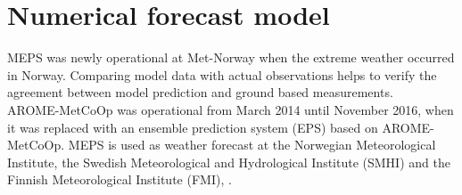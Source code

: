 \chapter{Numerical forecast model} \label{ch:MEPS}
MEPS was newly operational at Met-Norway when the extreme weather occurred in Norway. Comparing model data with actual observations helps to verify the agreement between model prediction and ground based measurements. 
\\
AROME-MetCoOp was operational from March 2014 until November 2016, when it was replaced with an ensemble prediction system (EPS) based on AROME-MetCoOp.
MEPS is used as weather forecast at the Norwegian Meteorological Institute, the Swedish Meteorological and Hydrological Institute (SMHI) and the Finnish Meteorological Institute (FMI), \citep{muller_arome-metcoop:_2017, koltzow_metcoop_2017}.
